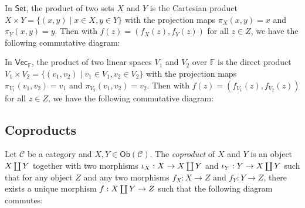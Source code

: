 \documentclass[
	11pt, %
	fleqn, %
	a4paper, %
]{LegrandOrangeBook}
\newcommand{\F}{\mathbb{F}} %
\newcommand{\C}{\mathcal{C}} %
\newcommand{\Set}{\boldsymbol{\mathsf{Set}}} %
\newcommand{\Vect}{\boldsymbol{\mathsf{Vec}}} %
\newcommand{\Ob}[1]{\mathsf{Ob}(#1)} %
\DeclareRobustCommand{\coprod}{\mathop{\text{\fakecoprod}}}
\newcommand{\fakecoprod}{%
    \sbox0{$\prod$}%
    \smash{\raisebox{\dimexpr.9625\depth-\dp0}{\scalebox{1}[-1]{$\prod$}}}%
    \vphantom{$\prod$}%
}
\begin{document}
\begin{example}
    In $\Set$, the product of two sets $X$ and $Y$ is the Cartesian product $X \times Y = \{ (x, y) \mid x \in X, y \in Y \}$ with the projection maps $\pi_X(x, y) = x$ and $\pi_Y(x, y) = y$. Then with $f(z) = (f_X(z), f_Y(z))$ for all $z \in Z$, we have the following commutative diagram:
    \begin{center}
    \end{center}
    
\end{example}

\begin{example}
    In $\Vect_{\F}$, the product of two linear spaces $V_1$ and $V_2$ over $\F$ is the direct product $V_1 \times V_2 = \{ (v_1, v_2) \mid v_1 \in V_1, v_2 \in V_2 \}$ with the projection maps $\pi_{V_1}(v_1, v_2) = v_1$ and $\pi_{V_2}(v_1, v_2) = v_2$. Then with $f(z) = (f_{V_1}(z), f_{V_2}(z))$ for all $z \in Z$, we have the following commutative diagram:
    \begin{center}
    \end{center}
\end{example}

\subsection{Coproducts}

\begin{definition}[Coproducts]
    Let $\C$ be a category and $X, Y \in \Ob{\C}$. The \emph{coproduct} of $X$ and $Y$ is an object $X \coprod Y$ together with two morphisms $\iota_X : X \to X \coprod Y$ and $\iota_Y : Y \to X \coprod Y$ such that for any object $Z$ and any two morphisms $f_X : X \to Z$ and $f_Y : Y \to Z$, there exists a unique morphism $f : X \coprod Y \to Z$ such that the following diagram commutes:
    \begin{center}
    \end{center}
\end{definition}
\end{document}
